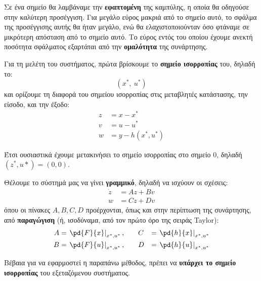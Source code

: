 \documentclass[11pt,a4paper,notitlepage,fleqn]{article}
\begin{document}
Σε ένα σημείο θα λαμβάναμε την \textbf{εφαπτομένη} της καμπύλης, η οποία
θα οδηγούσε στην καλύτερη προσέγγιση. Για μεγάλο εύρος μακριά από το
σημείο αυτό, το σφάλμα της προσέγγισης αυτής θα ήταν μεγάλο, ενώ θα
ελαχιστοποιούνταν όσο φτάναμε σε μικρότερη απόσταση από το σημείο αυτό.
Το εύρος εντός του οποίου έχουμε ανεκτή ποσότητα σφάλματος εξαρτάται
από την \textbf{ομαλότητα} της συνάρτησης.

Για τη μελέτη του συστήματος, πρώτα βρίσκουμε το \textbf{σημείο ισορροπίας} του, δηλαδή το:
\[
\left(x^*,\ u^*\right)
\]
και ορίζουμε τη διαφορά του σημείου ισορροπίας στις μεταβλητές κατάστασης, την είσοδο, και την έξοδο:
\begin{align*}
	z &= x - x^* \\
	v &= u - u^* \\
	w &= y - h(x^*, u^*)
\end{align*}

Έτσι ουσιαστικά έχουμε μετακινήσει το σημείο ισορροπίας στο σημείο
0, δηλαδή \( (z^*, u*) = (0,0) \).

Θέλουμε το σύστημά μας να γίνει \textbf{γραμμικό}, δηλαδή να ισχύουν οι σχέσεις:
\begin{align*}
	\dot z &= Az + Bv\\
	w &= Cz + Dv
\end{align*}
όπου οι πίνακες \( A,B,C,D \) προέρχονται, όπως και στην περίπτωση της
συνάρτησης, από \textbf{παραγώγιση} (ή, ισοδύναμα, από τον πρώτο όρο
της σειράς Taylor):
\begin{alignat*}{3}
	A &= \left. \pd{F}{x} \right|_{x^*,u^*}, \quad&& C &=
	\left. \pd{h}{x}\right|_{x^*,u^*} \\
	B &= \left. \pd{F}{u} \right|_{x^*,u^*}, \quad&& D &=
	\left. \pd{h}{u}\right|_{x^*,u^*}
\end{alignat*}

Βέβαια για να εφαρμοστεί η παραπάνω μέθοδος, πρέπει να \textbf{υπάρχει το
	σημείο ισορροπίας} του εξεταζόμενου συστήματος.
\end{document}
